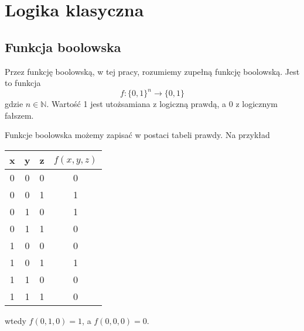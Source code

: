 \chapter{Logika klasyczna}
\thispagestyle{chapterBeginStyle}
\label{rozdzial0a}
\section{Funkcja boolowska}
\begin{definition}
    Przez funkcję boolowską, w tej pracy, rozumiemy zupełną funkcję boolowską. Jest to funkcja
    \[f:\{0,1\}^n \rightarrow \{0,1\}\]
    gdzie $n \in \mathbb{N}$. Wartość 1 jest utożsamiana z logiczną prawdą, a 0 z logicznym fałszem.
\end{definition}
\par Funkcje boolowska możemy zapisać w postaci tabeli prawdy. Na przykład
\begin{center}
    \begin{tabular}{| c  c  c | c |}
        \hline
        x & y & z & $f(x,y,z)$ \\ 
        \hline
        0 & 0 & 0 & 0 \\ 
        0 & 0 & 1 & 1 \\ 
        0 & 1 & 0 & 1 \\ 
        0 & 1 & 1 & 0 \\ 
        1 & 0 & 0 & 0 \\ 
        1 & 0 & 1 & 1 \\ 
        1 & 1 & 0 & 0 \\ 
        1 & 1 & 1 & 0 \\ 
        \hline 
    \end{tabular}
\end{center}
wtedy $f(0, 1, 0) = 1$, a $f(0,0,0) = 0$.
